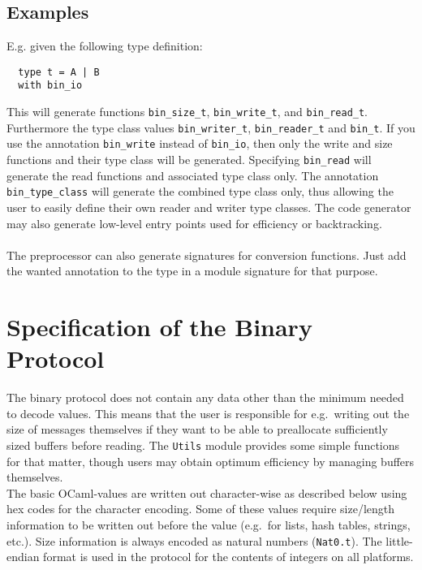 \documentclass[12pt]{article}
\begin{document}
\subsection{Examples}

E.g. given the following type definition:\\

\begin{verbatim}
  type t = A | B
  with bin_io
\end{verbatim}

This will generate functions \verb=bin_size_t=, \verb=bin_write_t=, and
\verb=bin_read_t=.  Furthermore the type class values \verb=bin_writer_t=,
\verb=bin_reader_t= and \verb=bin_t=.  If you use the annotation
\verb=bin_write= instead of \verb=bin_io=, then only the write and size
functions and their type class will be generated.  Specifying \verb=bin_read=
will generate the read functions and associated type class only.
The annotation \verb=bin_type_class= will generate the combined type class
only, thus allowing the user to easily define their own reader and writer
type classes.  The code generator may also generate low-level entry points
used for efficiency or backtracking.\\ \\ The preprocessor can also generate
signatures for conversion functions.  Just add the wanted annotation to the
type in a module signature for that purpose.

\section{Specification of the Binary Protocol}

The binary protocol does not contain any data other than the minimum needed
to decode values.  This means that the user is responsible for e.g.\
writing out the size of messages themselves if they want to be able to
preallocate sufficiently sized buffers before reading.  The \verb=Utils=
module provides some simple functions for that matter, though users may
obtain optimum efficiency by managing buffers themselves.\\

The basic OCaml-values are written out character-wise as described below
using hex codes for the character encoding.  Some of these values require
size/length information to be written out before the value (e.g.\ for lists,
hash tables, strings, etc.).  Size information is always encoded as natural
numbers (\verb=Nat0.t=).  The little-endian format is used in the protocol
for the contents of integers on all platforms.\\
\end{document}
